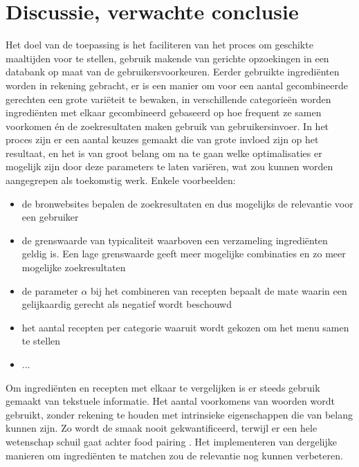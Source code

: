 \documentclass{hogent-article}
\begin{document}
\section{Discussie, verwachte conclusie}%
\label{sec:discussie-conclusie}

Het doel van de toepassing is het faciliteren van het proces om geschikte maaltijden voor te stellen, gebruik makende van gerichte opzoekingen in een databank op maat van de gebruikersvoorkeuren. Eerder gebruikte ingrediënten worden in rekening gebracht, er is een manier om voor een aantal gecombineerde gerechten een grote variëteit te bewaken, in verschillende categorieën worden ingrediënten met elkaar gecombineerd gebaseerd op hoe frequent ze samen voorkomen én de zoekresultaten maken gebruik van gebruikersinvoer. In het proces zijn er een aantal keuzes gemaakt die van grote invloed zijn op het resultaat, en het is van groot belang om na te gaan welke optimalisaties er mogelijk zijn door deze parameters te laten variëren, wat zou kunnen worden aangegrepen als toekomstig werk. Enkele voorbeelden:

\begin{itemize}
    \item de bronwebsites bepalen de zoekresultaten en dus mogelijks de relevantie voor een gebruiker
    \item de grenswaarde van typicaliteit \autocite{Yokoi2015} waarboven een verzameling ingrediënten geldig is. Een lage grenswaarde geeft meer mogelijke combinaties en zo meer mogelijke zoekresultaten
    \item de parameter $\alpha$ bij het combineren van recepten bepaalt de mate waarin een gelijkaardig gerecht als negatief wordt beschouwd
    \item het aantal recepten per categorie waaruit wordt gekozen om het menu samen te stellen
    \item ...
\end{itemize}

Om ingrediënten en recepten met elkaar te vergelijken is er steeds gebruik gemaakt van tekstuele informatie. Het aantal voorkomens van woorden wordt gebruikt, zonder rekening te houden met intrinsieke eigenschappen die van belang kunnen zijn. Zo wordt de smaak nooit gekwantificeerd, terwijl er een hele wetenschap schuil gaat achter food pairing \autocite{Ahn2011}. Het implementeren van dergelijke manieren om ingrediënten te matchen zou de relevantie nog kunnen verbeteren. 



\printbibliography[heading=bibintoc, title={Referenties}] 
\end{document}
